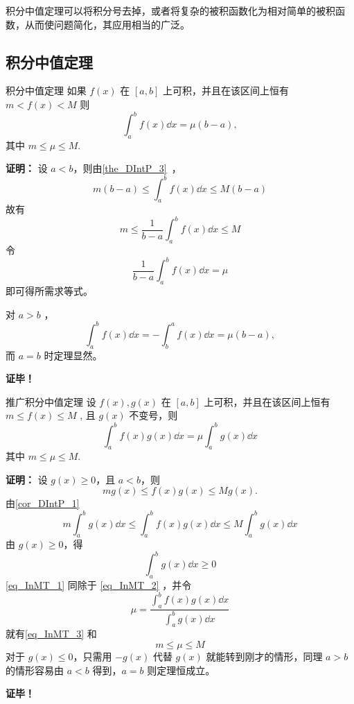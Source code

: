 
\begin{issues}
\issueDraft
\end{issues}

积分中值定理可以将积分号去掉，或者将复杂的被积函数化为相对简单的被积函数，从而使问题简化，其应用相当的广泛。

\subsection{积分中值定理}
\begin{theorem}{积分中值定理}
如果 $f(x)$ 在 $[a,b]$ 上可积，并且在该区间上恒有$m<f(x)<M$
则
\begin{equation}
\int_a^b f(x)\dd x=\mu(b-a),
\end{equation}
其中 $m\leq\mu\leq M.$
\end{theorem}

\textbf{证明：}
设 $a<b$，则由\autoref{the_DIntP_3}~，
\begin{equation}
m(b-a)\leq\int_a^b f(x)\dd x\leq M(b-a)
\end{equation}
故有
\begin{equation}
m\leq\frac{1}{b-a}\int_a^b f(x)\dd x\leq M
\end{equation}
令
\begin{equation}
\frac{1}{b-a}\int_a^b f(x)\dd x=\mu
\end{equation}
即可得所需求等式。

对 $a>b$ ，
\begin{equation}
\int_a^b f(x)\dd x=-\int_b^a f(x)\dd x=\mu(b-a),
\end{equation}
而 $a=b$ 时定理显然。 

\textbf{证毕！}

\begin{theorem}{推广积分中值定理}
设 $f(x),g(x)$ 在 $[a,b]$ 上可积，并且在该区间上恒有$m\leq f(x)\leq M$
, 且 $g(x)$ 不变号，则
\begin{equation}\label{eq_InMT_3}
\int_a^b f(x)g(x)\dd x=\mu\int_a^b g(x)\dd x
\end{equation}
其中 $m\leq\mu\leq M.$
\end{theorem}
\textbf{证明：}
设 $g(x)\geq 0$，且 $a<b$，则
\begin{equation}
mg(x)\leq f(x)g(x)\leq Mg(x).
\end{equation}
由\autoref{cor_DIntP_1}~
\begin{equation}\label{eq_InMT_1}
m\int_a^b g(x)\dd x\leq\int_a^b f(x)g(x)\dd x\leq M\int_a^b g(x)\dd x
\end{equation}
由 $g(x)\geq0$，得
\begin{equation}\label{eq_InMT_2}
\int_a^b g(x)\dd x\geq0
\end{equation}
\autoref{eq_InMT_1} 同除于 \autoref{eq_InMT_2} ，并令
\begin{equation}
\mu=\frac{\int_a^b f(x)g(x)\dd x}{\int_a^b g(x)\dd x}
\end{equation}
就有\autoref{eq_InMT_3} 和
\begin{equation}
m\leq\mu\leq M
\end{equation}
对于 $g(x)\leq0$，只需用 $-g(x)$ 代替 $g(x)$ 就能转到刚才的情形，同理 $a>b$ 的情形容易由 $a<b$ 得到，$a=b$ 则定理恒成立。

\textbf{证毕！}